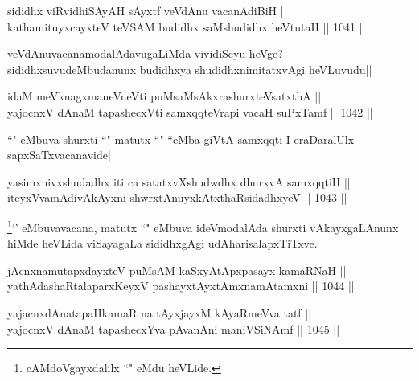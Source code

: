 \begin{shl}
sididhx viRvidhiSAyAH sAyxtf veVdAnu vacanAdiBiH |\\
kathamituyxcayxteV teVSAM budidhx saMshudidhx heVtutaH || 1041 ||
\end{shl}

\begin{artha}
veVdAnuvacanamodalAdavugaLiMda vividiSeyu heVge? sididhxsuvudeMbudanunx budidhxya shudidhxnimitatxvAgi heVLuvudu||
\end{artha}


\begin{shl}
idaM meV\s knagxmaneVneVti puMsaMsAkxrashurxteVsatxthA || \\
yajocnxV dAnaM tapashecxVti samxqqteVrapi vacaH suPxTamf ||  1042 || 
\end{shl}

\begin{artha}
``\stext" eMbuva shurxti ``\stext" matutx ``\stext" ``\stext eMba giVtA samxqqti I eraDaralUlx sapxSaTxvacanavide|
\end{artha}


\begin{shl}
yasimxnivxshudadhx iti ca satatxvXshudwdhx dhurxvA samxqqtiH || \\
iteyxVvamAdivAkAyxni shwrxtAnuyxkAtxthaRsidadhxyeV ||  1043 ||  
\end{shl}

\begin{artha}
\footnotemark\footnote{cAMdoVgayxdalilx ``\stext" eMdu heVLide.}`\stext' eMbuvavacana, matutx ``\stext" eMbuva ideVmodalAda shurxti vAkayxgaLAnunx hiMde heVLida viSayagaLa sididhxgAgi udAharisalapxTiTxve.
\end{artha}


\begin{shl}
jAcnxnamutapxdayxteV puMsAM kaSxyAtApxpasayx kamaRNaH || \\
yathA\s \s dashaRtalaparxKeyxV pashayxtAyxtAmxnamAtamxni ||  1044 ||  
\end{shl}

\begin{shl}
yajacnxdAnatapaHkamaR na tAyxjayxM kAyaRmeVva tatf || \\
yajocnxV dAnaM tapashecxYva pAvanAni maniVSiNAmf ||  1045 ||  
\end{shl}
				
